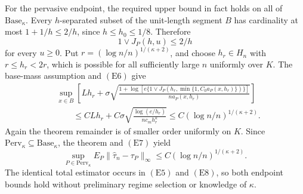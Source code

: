 For the pervasive endpoint, the required upper bound in fact holds on all
of \(\mathrm{Base}_\kappa\).  Every \(h\)-separated subset of the
unit-length segment \(B\) has cardinality at most
\(1+1/h\leq2/h\), since \(h\leq h_0\leq1/8\).  Therefore
\[
 1\vee J_P(h,u)\leq2/h
 \tag{E6}
\]
for every \(u\geq0\).  Put
\(r=(\log n/n)^{1/(\kappa+2)}\), and choose \(h_r\in H_n\) with
\(r\leq h_r<2r\), which is possible for all sufficiently large \(n\)
uniformly over \(K\).  The base-mass assumption and \((\mathrm{E6})\) give
\[
 \begin{aligned}
 &\sup_{x\in B}\left[
 Lh_r+\sigma\sqrt{
 \frac{1+\log[e\{1\vee
 J_P(h_r,\min\{1,C_0a_P(x,h_r)\})\}]}
 {na_P(x,h_r)}}\right]\\
 &\qquad\leq CLh_r+C\sigma
 \sqrt{\frac{\log(e/h_r)}{nc_mh_r^\kappa}}
 \leq C(\log n/n)^{1/(\kappa+2)}.
 \tag{E7}
 \end{aligned}
\]
Again the theorem remainder is of smaller order uniformly on \(K\).  Since
\(\mathrm{Perv}_\kappa\subseteq\mathrm{Base}_\kappa\), the theorem and
\((\mathrm{E7})\) yield
\[
 \sup_{P\in\mathrm{Perv}_\kappa}
 E_P\|\widehat\tau_n-\tau_P\|_\infty
 \leq C(\log n/n)^{1/(\kappa+2)}.
 \tag{E8}
\]
The identical total estimator occurs in \((\mathrm{E5})\) and
\((\mathrm{E8})\), so both endpoint bounds hold without preliminary regime
selection or knowledge of \(\kappa\).
